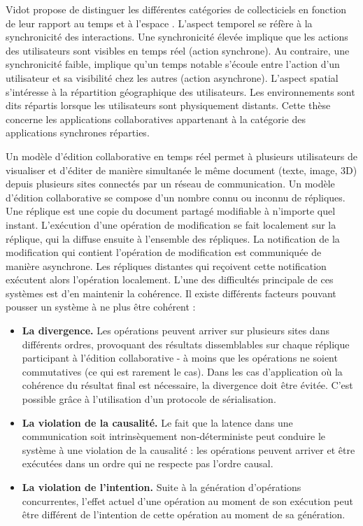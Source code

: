 Vidot propose de distinguer les différentes catégories de collecticiels en fonction 
de leur rapport au temps et à l'espace \cite{Vidot2002}. 
L'aspect temporel se réfère à la synchronicité des interactions. 
Une synchronicité élevée implique que les actions des utilisateurs sont visibles en 
temps réel (action synchrone). 
Au contraire, une synchronicité faible, implique qu'un temps notable s'écoule entre 
l'action d'un utilisateur et sa visibilité chez les autres (action asynchrone). L'aspect 
spatial s'intéresse à la répartition géographique des utilisateurs. Les 
environnements sont dits répartis lorsque les utilisateurs sont physiquement 
distants. Cette thèse concerne les applications collaboratives appartenant à la 
catégorie 
des applications synchrones réparties.

Un modèle d'édition collaborative en temps réel permet à plusieurs utilisateurs de 
visualiser et d'éditer de manière simultanée le même document (texte, image, 3D) 
depuis plusieurs sites connectés par un réseau de communication. Un modèle 
d'édition collaborative se compose d'un nombre connu ou inconnu de répliques. 
Une réplique est une copie du document partagé modifiable à n'importe quel 
instant. L'exécution d'une opération de modification se fait localement sur la 
réplique, qui la diffuse ensuite à l'ensemble des répliques. La notification de la 
modification qui contient l'opération de modification est communiquée de manière 
asynchrone. Les répliques distantes qui reçoivent cette notification exécutent 
alors l'opération localement. L'une des difficultés principale de ces systèmes 
est d'en maintenir la cohérence. Il existe différents facteurs pouvant 
pousser un système à ne plus être cohérent :
\begin{itemize}
	\item \textbf{La divergence.} Les opérations peuvent arriver sur plusieurs sites 
	dans différents ordres, provoquant des résultats dissemblables sur chaque réplique 
	participant à l'édition collaborative - à moins que les opérations ne soient 
	commutatives (ce qui est rarement le cas). Dans les cas d'application où la 
	cohérence du résultat final est nécessaire, la divergence doit être évitée. C'est possible grâce à l'utilisation d'un protocole de 
	sérialisation.
	\item \textbf{La violation de la causalité.} Le fait que la latence dans une 
	communication 
	soit intrinsèquement non-déterministe peut conduire le système à une violation de 
	la causalité : les opérations peuvent arriver et être exécutées dans un ordre 
	qui ne respecte pas l'ordre causal.
	\item \textbf{La violation de l'intention.} Suite à la génération d'opérations 
	concurrentes, 
	l'effet actuel d'une opération au moment de son exécution peut être différent de 
	l'intention de cette opération au moment de sa génération.
\end{itemize}
